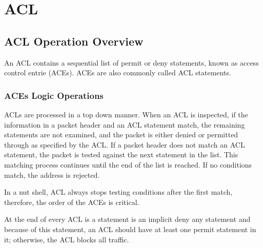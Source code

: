 \chapter{ACL}
\section{ACL Operation Overview}
An ACL contains a sequential list of permit or deny statements, known as access control entrie (ACEs). ACEs are also commonly called ACL statements. 
\subsection{ACEs Logic Operations}
ACLs are processed in a top down manner. When an ACL is inspected, if the information in a packet header and an ACL statement match, the remaining statements are not examined, and the packet is either denied or permitted through as specified by the ACL. If a packet header does not match an ACL statement, the packet is tested against the next statement in the list. This matching process continues until the end of the list is reached. If no conditions match, the address is rejected.\par 
In a nut shell, ACL always stops testing conditions after the first match, therefore, the order of the ACEs is critical.\par 
At the end of every ACL is a statement is an implicit deny any statement and because of this
statement, an ACL should have at least one permit statement in it; otherwise, the ACL blocks all traffic.
